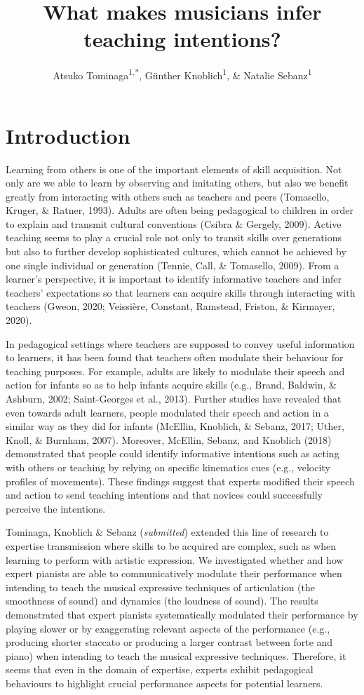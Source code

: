 \documentclass[
  man,floatsintext]{apa6}
\title{What makes musicians infer teaching intentions?}
\author{Atsuko Tominaga\textsuperscript{1,*}, Günther Knoblich\textsuperscript{1}, \& Natalie Sebanz\textsuperscript{1}}
\date{}
\affiliation{\vspace{0.5cm}\textsuperscript{1} Department of Cognitive Science, Central European University, Quellenstraße 51, 1100 Vienna, Austria\\\textsuperscript{*} Corresponding author: \href{mailto:Tominaga_Atsuko@phd.ceu.edu}{\nolinkurl{Tominaga\_Atsuko@phd.ceu.edu}}}
\begin{document}
\maketitle

\hypertarget{introduction}{%
\section{Introduction}\label{introduction}}

Learning from others is one of the important elements of skill acquisition. Not only are we able to learn by observing and imitating others, but also we benefit greatly from interacting with others such as teachers and peers (Tomasello, Kruger, \& Ratner, 1993). Adults are often being pedagogical to children in order to explain and transmit cultural conventions (Csibra \& Gergely, 2009). Active teaching seems to play a crucial role not only to transit skills over generations but also to further develop sophisticated cultures, which cannot be achieved by one single individual or generation (Tennie, Call, \& Tomasello, 2009). From a learner's perspective, it is important to identify informative teachers and infer teachers' expectations so that learners can acquire skills through interacting with teachers (Gweon, 2020; Veissière, Constant, Ramstead, Friston, \& Kirmayer, 2020).

In pedagogical settings where teachers are supposed to convey useful information to learners, it has been found that teachers often modulate their behaviour for teaching purposes. For example, adults are likely to modulate their speech and action for infants so as to help infants acquire skills (e.g., Brand, Baldwin, \& Ashburn, 2002; Saint-Georges et al., 2013). Further studies have revealed that even towards adult learners, people modulated their speech and action in a similar way as they did for infants (McEllin, Knoblich, \& Sebanz, 2017; Uther, Knoll, \& Burnham, 2007). Moreover, McEllin, Sebanz, and Knoblich (2018) demonstrated that people could identify informative intentions such as acting with others or teaching by relying on specific kinematics cues (e.g., velocity profiles of movements). These findings suggest that experts modified their speech and action to send teaching intentions and that novices could successfully perceive the intentions.

Tominaga, Knoblich \& Sebanz (\emph{submitted}) extended this line of research to expertise transmission where skills to be acquired are complex, such as when learning to perform with artistic expression. We investigated whether and how expert pianists are able to communicatively modulate their performance when intending to teach the musical expressive techniques of articulation (the smoothness of sound) and dynamics (the loudness of sound). The results demonstrated that expert pianists systematically modulated their performance by playing slower or by exaggerating relevant aspects of the performance (e.g., producing shorter staccato or producing a larger contrast between forte and piano) when intending to teach the musical expressive techniques. Therefore, it seems that even in the domain of expertise, experts exhibit pedagogical behaviours to highlight crucial performance aspects for potential learners.
\end{document}
